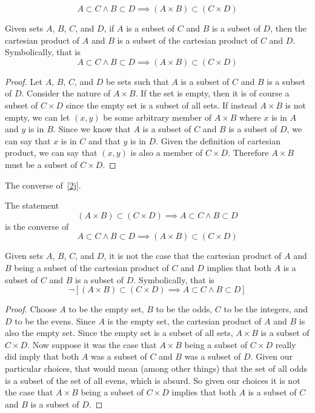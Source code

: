\documentclass[main.tex]{subfiles}
\begin{document}
\subproblem{}\label{2j}
\[A \subset C \land B \subset D \implies (A \times B) \subset (C \times D)\]
\begin{thm}
	Given sets \(A\), \(B\), \(C\), and \(D\), if \(A\) is a subset of \(C\)
	and \(B\) is a subset of \(D\), then the cartesian product of \(A\) and
	\(B\) is a subset of the cartesian product of \(C\) and \(D\).
	Symbolically, that is
	\[A \subset C \land B \subset D \implies (A \times B) \subset (C \times D)\]
\end{thm}
\begin{proof}
	Let \(A\), \(B\), \(C\), and \(D\) be sets such that \(A\) is a subset
	of \(C\) and \(B\) is a subset of \(D\). Consider the nature of
	\(A \times B\). If the set is empty, then it is of course a subset of
	\(C \times D\) since the empty set is a subset of all sets. If instead
	\(A \times B\) is not empty, we can let \((x, y)\) be some arbitrary
	member of \(A \times B\) where \(x\) is in \(A\) and \(y\) is in \(B\).
	Since we know that \(A\) is a subset of \(C\) and \(B\) is a subset of
	\(D\), we can say that \(x\) is in \(C\) and that \(y\) is in \(D\).
	Given the definition of cartesian product, we can say that \((x, y)\) is
	also a member of \(C \times D\). Therefore \(A \times B\) must be a
	subset of \(C \times D\).
\end{proof}

\subproblem{}\label{2k}
The converse of~\ref{2j}.
\begin{remark}
	The statement
	\[(A \times B) \subset (C \times D) \implies A \subset C \land B \subset D\]
	is the converse of
	\[A \subset C \land B \subset D \implies (A \times B) \subset (C \times D)\]
\end{remark}

\begin{thm}
	Given sets \(A\), \(B\), \(C\), and \(D\), it is not the case that the
	cartesian product of \(A\) and \(B\) being a subset of the cartesian
	product of \(C\) and \(D\) implies that both \(A\) is a subset of \(C\)
	and \(B\) is a subset of \(D\). Symbolically, that is
	\[\neg [(A \times B) \subset (C \times D) \implies A \subset C \land B \subset D]\]
\end{thm}
\begin{proof}
	Choose \(A\) to be the empty set, \(B\) to be the odds, \(C\)
	to be the integers, and \(D\) to be the evens. Since \(A\) is the empty
	set, the cartesian product of \(A\) and \(B\) is also the empty set.
	Since the empty set is a subset of all sets, \(A \times B\) is a subset
	of \(C \times D\). Now suppose it was the case that \(A \times B\) being
	a subset of \(C \times D\) really did imply that both \(A\) was a subset
	of \(C\) and \(B\) was a subset of \(D\). Given our particular choices,
	that would mean (among other things) that the set of all odds is a
	subset of the set of all evens, which is absurd. So given our choices it
	is not the case that \(A \times B\) being a subset of \(C \times D\)
	implies that both \(A\) is a subset of \(C\) and \(B\) is a subset of
	\(D\).
\end{proof}
\end{document}

